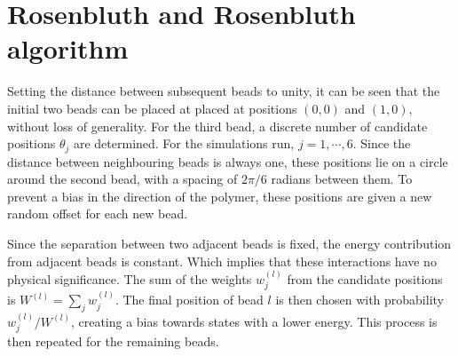 \section{Rosenbluth and Rosenbluth algorithm}
Setting the distance between subsequent beads to unity, it can be seen that the initial two beads can be placed at placed at positions $(0,0)$ and $(1,0)$, without loss of generality. For the third bead, a discrete number of candidate positions $\theta_j$ are determined. For the simulations run, $j=1,\cdots,6$. Since the distance between neighbouring beads is always one, these positions lie on a circle around the second bead, with a spacing of $2\pi/6$ radians between them. To prevent a bias in the direction of the polymer, these positions are given a new random offset for each new bead.

Since the separation between two adjacent beads is fixed, the energy contribution from adjacent beads is constant. Which implies that these interactions have no physical significance. The sum of the weights $w_j^{(l)}$ from the candidate positions is $W^{(l)} = \sum_j w_j^{(l)}$. The final position of bead $l$ is then chosen with probability $w_j^{(l)}/W^{(l)}$, creating a bias towards states with a lower energy. This process is then repeated for the remaining beads.
